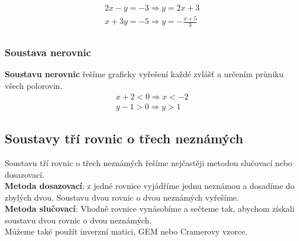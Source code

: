 \documentclass[12pt, a4paper]{article}
\newcommand{\imply}{\Rightarrow}
\begin{document}
\[
\begin{aligned}
2x-y=-3 \imply y = 2x+3\\
x+3y=-5 \imply y=-\frac{x+5}{3}\\
\end{aligned}
\]

\begin{figure}[H]
\centering
{}
\end{figure}
\pagebreak
\subsubsection*{Soustava nerovnic}
\textbf{Soustavu nerovnic} řešíme graficky vyřešení každé zvlášť a určením průniku všech polorovin.\\
\[
\begin{aligned}
x+2 < 0 \imply x<-2\\
y-1 > 0 \imply y>1
\end{aligned}
\]

\begin{figure}[H]
\centering
{}
\end{figure}

\subsection*{Soustavy tří rovnic o třech neznámých}
Soustavu tří rovnic o třech neznámých řešíme nejčastěji metodou slučovací nebo dosazovací.\\
\textbf{Metoda dosazovací}: z jedné rovnice vyjádříme jednu neznámou a dosadíme do zbylých dvou. Soustavu dvou rovnic o dvou neznámých vyřešíme.\\
\textbf{Metoda slučovací}: Vhodně rovnice vynásobíme a sečteme tak, abychom získali soustavu dvou rovnic o dvou neznámých.\\
Můžeme také použít inverzní matici, GEM nebo Cramerovy vzorce.
\pagebreak
\end{document}
